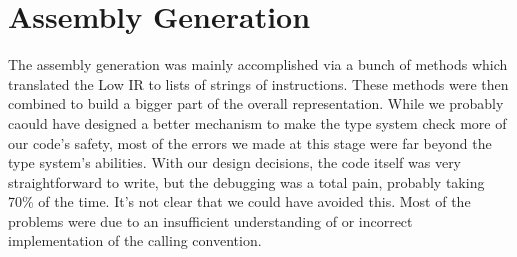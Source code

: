\documentclass[11pt]{article}
\begin{document}
\section {Assembly Generation}  
\label{sec:assembly}
The assembly generation was mainly accomplished via a bunch of methods
which translated the Low IR to lists of strings of instructions. These
methods were then combined to build a bigger part of the overall
representation. While we probably caould have designed a better
mechanism to make the type system check more of our code's safety,
most of the errors we made at this stage were far beyond the type
system's abilities. With our design decisions, the code itself was
very straightforward to write, but the debugging was a total pain,
probably taking 70\% of the time. It's not clear that we could have
avoided this. Most of the problems were due to an insufficient
understanding of or incorrect implementation of the calling
convention.
\end{document}
